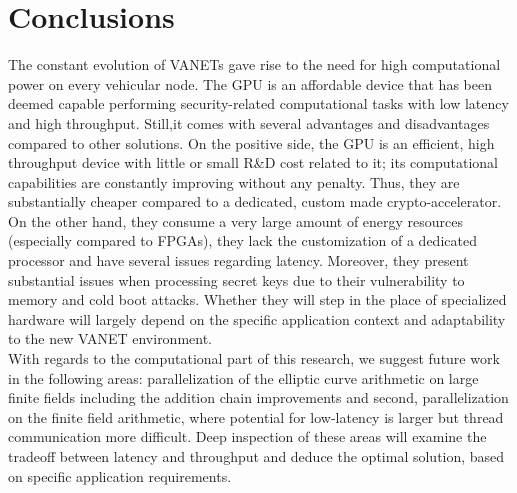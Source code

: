 \documentclass[11pt,twocolumn]{IEEEtran}
\begin{document}
\section{Conclusions}\label{conclusions}
The constant evolution of VANETs gave rise to the need for high computational power on every vehicular node. The GPU is an affordable device that has been deemed capable performing security-related computational tasks with low latency and high throughput. Still,it comes with several advantages and disadvantages compared to other solutions. On the positive side, the GPU is an efficient, high throughput device with little or small R\&D cost related to it; its computational capabilities are constantly improving without any penalty. Thus, they are substantially cheaper compared to a dedicated, custom made crypto-accelerator. On the other hand, they consume a very large amount of energy resources (especially compared to FPGAs), they lack the customization of a dedicated processor and have several issues regarding latency. Moreover, they present substantial issues when processing secret keys due to their vulnerability to memory and cold boot attacks. Whether they will step in the place of specialized hardware will largely depend on the specific application context and adaptability to the new VANET environment. \\
With regards to the computational part of this research, we suggest future work in the following areas: parallelization of the elliptic curve arithmetic on large finite fields including the addition chain improvements and second, parallelization on the finite field arithmetic, where potential for low-latency is larger but thread communication more difficult. Deep inspection of these areas will examine the tradeoff between latency and throughput and deduce the optimal solution, based on specific application requirements.
\onecolumn
\end{document}
